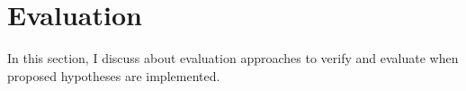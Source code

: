 \section{Evaluation}
\label{sec:eval}

In this section, I discuss about evaluation approaches to verify and evaluate
when proposed hypotheses are implemented.
